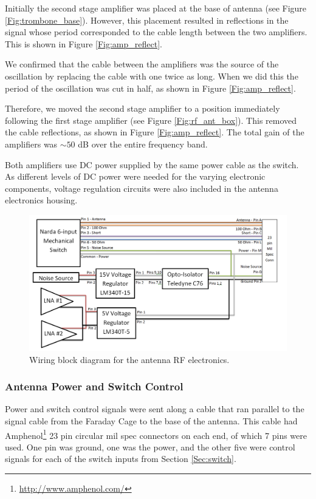 Initially the second stage amplifier was placed at the base of antenna (see Figure \ref{Fig:trombone_base}). However, this placement resulted in reflections in the signal whose period corresponded to the cable length between the two amplifiers. This is shown in Figure \ref{Fig:amp_reflect}. 

We confirmed that the cable between the amplifiers was the source of the oscillation by replacing the cable with one twice as long. When we did this the period of the oscillation was cut in half, as shown in Figure \ref{Fig:amp_reflect}. 

Therefore, we moved the second stage amplifier to a position immediately following the first stage amplifier (see Figure \ref{Fig:rf_ant_box}). This removed the cable reflections, as shown in Figure \ref{Fig:amp_reflect}. The total gain of the amplifiers was $\sim 50$ dB over the entire frequency band. 

Both amplifiers use DC power supplied by the same power cable as the switch. As different levels of DC power were needed for the varying electronic components, voltage regulation circuits were also included in the antenna electronics housing. 

\begin{figure}[htb]
\begin{center}
\includegraphics[width=0.9\linewidth]{SCIHI_system/figures/antenna_rf_power_block_diagram.png}
\caption{Wiring block diagram for the antenna RF electronics.}
\label{Fig:ant_RF_pow_block_diagram}
\end{center}
\end{figure}

\subsubsection{Antenna Power and Switch Control} \label{Sec:ant_pow}
Power and switch control signals were sent along a cable that ran parallel to the signal cable from the Faraday Cage to the base of the antenna. This cable had Amphenol\footnote{\url{http://www.amphenol.com/}} 23 pin circular mil spec connectors on each end, of which 7 pins were used. One pin was ground, one was the power, and the other five were control signals for each of the switch inputs from Section \ref{Sec:switch}. 

